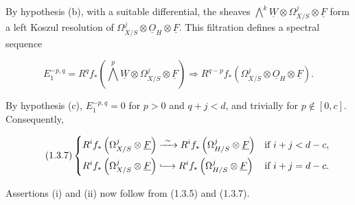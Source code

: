 By hypothesis (b), with a suitable differential, the sheaves
$\bigwedge^k\underline W\otimes\Omega^j_{X/S}\otimes\underline F$ form a
left Koszul resolution of
$\Omega^j_{X/S}\otimes\underline O_H\otimes\underline F$.  This
filtration defines a spectral sequence

\begin{equation}\tag{1.3.6}
E_1^{-p,q}=R^qf_*\left(\bigwedge^p\underline W\otimes
\Omega^j_{X/S}\otimes\underline F\right)
\Longrightarrow
R^{q-p}f_*\left(\Omega^j_{X/S}\otimes\underline O_H
\otimes\underline F\right).
\end{equation}

By hypothesis (c), $E_1^{-p,q}=0$ for $p>0$ and $q+j<d$, and trivially
for $p\notin[0,c]$.  Consequently,

\begin{equation}\tag{1.3.7}
\left\{
\begin{aligned}
R^if_*\left(\Omega^j_{X/S}\otimes\underline F\right)
&\xrightarrow{\ \sim\ }
R^if_*\left(\Omega^j_{H/S}\otimes\underline F\right)
&&\text{if }i+j<d-c,\\
R^if_*\left(\Omega^j_{X/S}\otimes\underline F\right)
&\lhook\joinrel\longrightarrow
R^if_*\left(\Omega^j_{H/S}\otimes\underline F\right)
&&\text{if }i+j=d-c.
\end{aligned}
\right.
\end{equation}

Assertions (i) and (ii) now follow from (1.3.5) and (1.3.7).

